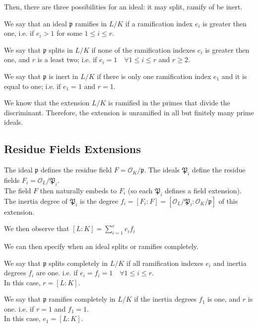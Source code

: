 Then, there are three possibilities for an ideal: it may split, ramify of be inert.
\begin{definition}
    We say that an ideal $\mathfrak{p}$ ramifies in $L/K$ if a ramification index $e_i$ is greater then one, 
    i.e. if $e_i>1$ for some $1 \leq i \leq r$.
\end{definition}
\begin{definition}
    We say that $\mathfrak{p}$ splits in $L/K$ if none of the ramification indexes $e_i$ is greater then one, and $r$ is a least two; 
    i.e. if $e_i=1 \quad \forall 1 \leq i \leq r$ and $r \geq 2$.
\end{definition}
\begin{definition}
    We say that $\mathfrak{p}$ is inert in $L/K$ if there is only one ramification index $e_1$ and it is equal to one;
    i.e. if $e_1=1$ and $r=1$.
\end{definition}
We know that the extension $L/K$ is ramified in the primes that divide the discriminant. Therefore, the extension is unramified in all but finitely many prime ideals.


\subsection{Residue Fields Extensions}
The ideal $\mathfrak{p}$ defines the residue field $F=\mathcal{O}_K/\mathfrak{p}$.
The ideals $\mathfrak{P}_i$ define the residue fields $F_i=\mathcal{O}_L/\mathfrak{P}_i$.\\
The field $F$ then naturally embeds to $F_i$ (so each $\mathfrak{P}_i$ defines a field extension).
The inertia degree of $\mathfrak{P}_i$ is the degree $f_i=[F_i:F]=[\mathcal{O}_L/\mathfrak{P}_i:\mathcal{O}_K/\mathfrak{p}]$ of this extension.

We then observe that $[L:K] = \sum_{i=1}^r e_if_i$

We can then specify when an ideal splits or ramifies completely.
\begin{definition}
    We say that $\mathfrak{p}$ splits completely in $L/K$ if all ramification indexes $e_i$ and inertia degrees $f_i$ are one.
    i.e. if $e_i=f_i=1 \quad \forall 1 \leq i \leq r$.\\
    In this case, $r=[L:K]$.
\end{definition}
\begin{definition}
    We say that $\mathfrak{p}$ ramifies completely in $L/K$ if the inertia degrees $f_1$ is one, and $r$ is one.
    i.e. if $r=1$ and $f_1=1$.\\
    In this case, $e_1=[L:K]$.
\end{definition}

